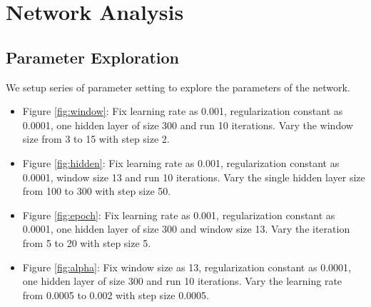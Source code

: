 \documentclass[letterpaper]{article}
\begin{document}
\section{Network Analysis}
\subsection{Parameter Exploration}
We setup series of parameter setting to explore the parameters of the network.
\begin{itemize}
\item Figure \ref{fig:window}: Fix learning rate as 0.001, regularization constant as 0.0001, one hidden layer of size 300 and run 10 iterations. Vary the window size from 3 to 15 with step size 2.
\item Figure \ref{fig:hidden}: Fix learning rate as 0.001, regularization constant as 0.0001, window size 13 and run 10 iterations. Vary the single hidden layer size from 100 to 300 with step size 50.
\item Figure \ref{fig:epoch}: Fix learning rate as 0.001, regularization constant as 0.0001, one hidden layer of size 300 and window size 13. Vary the iteration from 5 to 20 with step size 5.
\item Figure \ref{fig:alpha}: Fix window size as 13, regularization constant as 0.0001, one hidden layer of size 300 and run 10 iterations. Vary the learning rate from 0.0005 to 0.002 with step size 0.0005.
\end{itemize}
\end{document}
